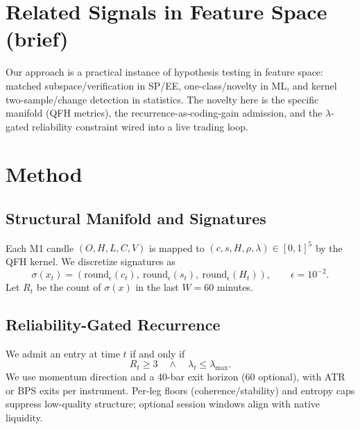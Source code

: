 \documentclass[11pt]{article}
\begin{document}
\section{Related Signals in Feature Space (brief)}
Our approach is a practical instance of hypothesis testing in feature space: matched subspace/verification
in SP/EE, one-class/novelty in ML, and kernel two-sample/change detection in statistics. The novelty here
is the specific manifold (QFH metrics), the recurrence-as-coding-gain admission, and the $\lambda$-gated reliability
constraint wired into a live trading loop.

\section{Method}
\subsection{Structural Manifold and Signatures}
Each M1 candle $(O,H,L,C,V)$ is mapped to $(c,s,H,\rho,\lambda)\in[0,1]^5$ by the QFH kernel.
We discretize signatures as
\begin{equation*}
\sigma(x_t)=\left(\mathrm{round}_\epsilon(c_t),~\mathrm{round}_\epsilon(s_t),~\mathrm{round}_\epsilon(H_t)\right),
\qquad \epsilon=10^{-2}.
\end{equation*}
Let $R_t$ be the count of $\sigma(x)$ in the last $W=60$ minutes.

\subsection{Reliability-Gated Recurrence}
We admit an entry at time $t$ if and only if
\begin{equation*}
R_t \ge 3 \quad \wedge \quad \lambda_t \le \lambda_{\max}.
\end{equation*}
We use momentum direction and a 40-bar exit horizon (60 optional), with ATR or BPS exits per instrument.
Per-leg floors (coherence/stability) and entropy caps suppress low-quality structure; optional session windows
align with native liquidity.
\end{document}
